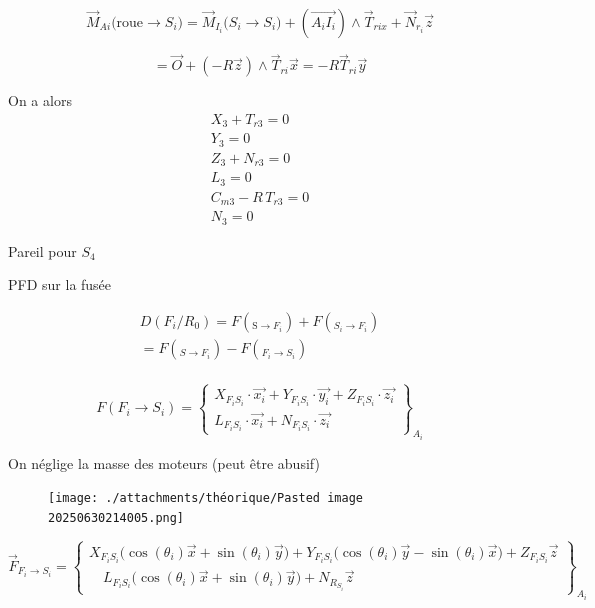 \documentclass[a4paper,12pt]{report}  %
\begin{document}
$$
\vec{M}_{Ai}({\text{roue} \rightarrow S_i)} = \vec{M}_{I_i}({S_i \rightarrow S_i)} + \left( \overrightarrow{A_iI_i} \right) \wedge \vec{T}_{rix} + \vec{N}_{r_i} \vec{z}
$$

$$ = \vec{O} + ({-R}\vec{z})\wedge\vec{T}_{ri}\vec{x} = -R\vec{T}_{ri}\vec{y}
$$

On a alors
\begin{align}
	X_3 + T_{r3} = 0  \\
	Y_3 = 0  \\
	Z_3 + N_{r3} = 0  \\
	L_3 = 0  \\
	C_{m3} - R\,T_{r3} = 0  \\
	N_3 = 0 
\end{align}


Pareil pour $S_4$

PFD sur la fusée


\begin{align}
	D(F_i/R_0) = {F}(_{\text{S}\rightarrow F_i}) + {F}(_{S_i \rightarrow F_i}) \\
	= {F}(_{S \rightarrow F_i}) - {F}(_{F_i \rightarrow S_i}) \\
\end{align}






\begin{equation}
F(F_i \to S_i) = 
\begin{Bmatrix}
	X_{F_i S_i} \cdot \vec{x_i} + Y_{F_i S_i} \cdot \vec{y_i} + Z_{F_i S_i} \cdot \vec{z_i} \\
	L_{F_i S_i} \cdot \vec{x_i} + N_{F_i S_i} \cdot \vec{z_i}
\end{Bmatrix}_{A_{i}}
\end{equation}



On néglige la masse des moteurs (peut être abusif)


\begin{figure}[H]
	\centering
	\texttt{[image: ./attachments/théorique/Pasted image 20250630214005.png]}
	\caption{}
\end{figure}



\begin{equation}
\vec{F}_{F_i \to S_i} =
\left\{
\begin{array}{c}
	X_{F_iS_i} \big(\cos(\theta_i) \vec{x} + \sin(\theta_i) \vec{y} \big) 
	
	+  Y_{F_iS_i} \big(\cos(\theta_i) \vec{y} - \sin(\theta_i) \vec{x} \big)
	
	+ Z_{F_iS_i} \vec{z} \\[1em]
	
	\quad L_{F_iS_i} \big(\cos(\theta_i) \vec{x} + \sin(\theta_i) \vec{y} \big)  + N_{R_{S_i}} \vec{z}
	
\end{array}
\right\}_{A_i}
\end{equation}
\end{document}
